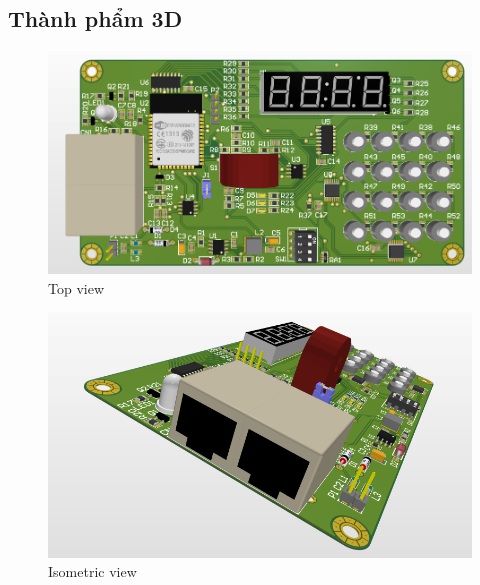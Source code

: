 \subsection{Thành phẩm 3D}
\begin{figure}[!htbp]
    \centering
    \includegraphics[width=\textwidth]{graphics/section3/f9.PNG}
    \caption{Top view}
\end{figure}
\FloatBarrier
\pagebreak
{ }
\begin{figure}[!htbp]
    \centering
    \includegraphics[width=\textwidth]{graphics/section3/f10.PNG}
    \caption{Isometric view}
\end{figure}
\FloatBarrier

